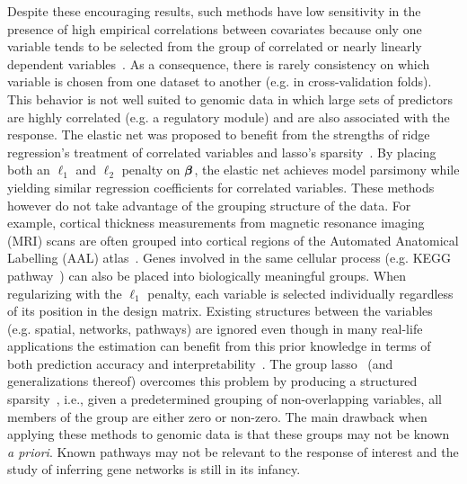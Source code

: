 Despite these encouraging results, such methods have low sensitivity in the presence of high empirical correlations between covariates because only one variable tends to be selected from the group of correlated or nearly linearly dependent variables~\citep{buhlmann2013correlated}. 
As a consequence, there is rarely consistency on which variable is chosen from one dataset to another (e.g. in cross-validation folds). This behavior is not well suited to genomic data in which large sets of predictors are highly correlated (e.g. a regulatory module) and are also associated with the response. 
The elastic net was proposed to benefit from the strengths of ridge regression's treatment of correlated variables and lasso's sparsity~\citep{zou2005regularization}. By placing both an $\ell_1$ and $\ell_2$ penalty on $\boldsymbol{\beta}$, the elastic net achieves model parsimony while yielding similar regression coefficients for correlated variables. 
These methods however do not take advantage of the grouping structure of the data. For example, cortical thickness measurements from magnetic resonance imaging (MRI) scans are often grouped into cortical regions of the Automated Anatomical Labelling (AAL) atlas~\citep{tzourio2002automated}. 
Genes involved in the same cellular process (e.g. KEGG pathway~\citep{kanehisa2008kegg}) can also be placed into biologically meaningful groups. When regularizing with the $\ell_1$ penalty, each variable is selected individually regardless of its position in the design matrix. 
Existing structures between the variables (e.g. spatial, networks, pathways) are ignored even though in many real-life applications the estimation can benefit from this prior knowledge in terms of both prediction accuracy and interpretability~\citep{bach2012structured}. 
The group lasso~\citep{yuan2006model} (and generalizations thereof) overcomes this problem by producing a structured sparsity~\citep{bach2012structured}, i.e., given a predetermined grouping of non-overlapping variables, all members of the group are either zero or non-zero. 
The main drawback when applying these methods to genomic data is that these groups may not be known \textit{a priori}. Known pathways may not be relevant to the response of interest and the study of inferring gene networks is still in its infancy. 




